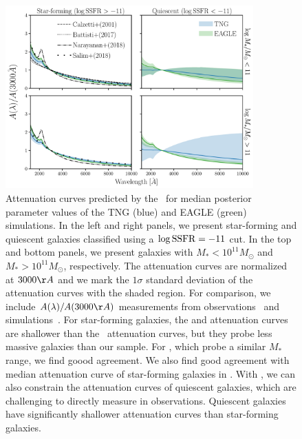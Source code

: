 \begin{figure}
\begin{center}
    \includegraphics[width=0.85\textwidth]{figs/abc_attenuation.pdf}
    \caption{\label{fig:atten}
    Attenuation curves predicted by the \eda~for median posterior parameter
    values of the TNG (blue) and EAGLE (green) simulations. In the left and
    right panels, we present star-forming and quiescent galaxies classified
    using a $\log {\rm SSFR} = -11$ cut. In the top and bottom panels, we
    present galaxies with $M_* < 10^{11} M_\odot$ and $M_* > 10^{11} M_\odot$,
    respectively. The attenuation curves are normalized at
    $3000\AA$ and we mark the $1\sigma$ standard deviation of the attenuation 
    curves with the shaded region. For comparison, we include
    $A(\lambda)/A(3000\AA)$ measurements from observations~\citep{calzetti2000,
    battisti2017, salim2018} and simulations~\citep{narayanan2018}. 
    For star-forming galaxies, the \cite{calzetti2000} and \cite{battisti2017}
    attenuation curves are shallower than the \eda~attenuation curves, but 
    they probe less massive galaxies than our sample. For \cite{salim2018}, 
    which probe a similar $M_*$ range, we find goood agreement. We also find good agreement with 
    median attenuation curve of star-forming galaxies in \cite{narayanan2018}.
    With \eda, we can also constrain the attenuation curves of quiescent 
    galaxies, which are challenging to directly measure in observations. 
    Quiescent galaxies have significantly shallower attenuation curves than
    star-forming galaxies.
    }
\end{center}
\end{figure}

